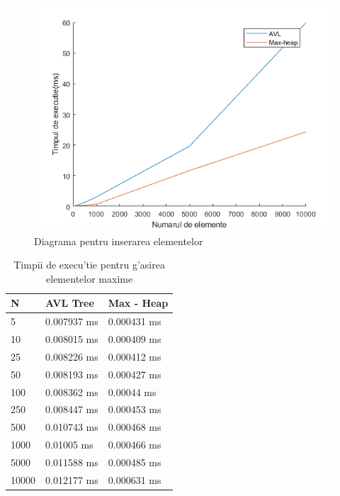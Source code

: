 \begin{figure}[ht]
\centering
\includegraphics[scale=0.8]{Fisiere/inserare}
\caption {Diagrama pentru inserarea elementelor}
\end{figure}
\FloatBarrier

\vspace{5 mm}
\begin{table}[ht]
\centering
\caption{Timpii de execu'tie pentru g'asirea elementelor maxime}
\begin{tabular}{| p{5cm} | p{5cm} | p{5cm} |}
\hline
N & AVL Tree & Max - Heap \\
\hline\hline
5 & 0.007937 ms & 0.000431 ms \\
\hline
10 & 0.008015 ms & 0.000409 ms \\
\hline
25 & 0.008226 ms & 0.000412 ms \\
\hline
50 & 0.008193 ms & 0.000427 ms \\
\hline
100 & 0.008362 ms & 0.00044 ms \\
\hline
250 & 0.008447 ms & 0.000453 ms \\
\hline
500 & 0.010743 ms & 0.000468 ms \\
\hline
1000 & 0.01005 ms & 0.000466 ms \\
\hline
5000 & 0.011588 ms & 0.000485 ms \\
\hline
10000 & 0.012177 ms & 0.000631 ms \\
\hline
\end{tabular}
\end{table}
\FloatBarrier

